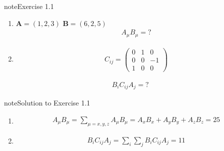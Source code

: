 \documentclass[letterpaper,10pt,english]{jupyterBook}
\begin{document}
\begin{sphinxadmonition}{note}{Exercise 1.1}


\begin{enumerate}
%
\item {} 
\sphinxAtStartPar
\(\mathbf{A} =(1,2,3)\)
\(\mathbf{B} =(6,2,5)\)
\begin{equation*}
\begin{split}A_\mu B_{\mu} =?\end{split}
\end{equation*}
\item {} \begin{equation*}
\begin{split} C_{ij} = \begin{pmatrix}
0&1&0\\
0&0&-1\\
1&0&0
\end{pmatrix}\end{split}
\end{equation*}
\end{enumerate}
\begin{equation*}
\begin{split}B_iC_{ij}A_j=?\end{split}
\end{equation*}\end{sphinxadmonition}
 \label{va/vec_alge:solu_ten}

\begin{sphinxadmonition}{note}{Solution to Exercise 1.1}


\begin{enumerate}
%
\item {} \begin{equation*}
\begin{split}A_\mu B_\mu =\sum_{\mu = x,y,z}A_\mu B_\mu = A_x B_x + A_y B_y+A_zB_z=25 \end{split}
\end{equation*}
\item {} \begin{equation*}
\begin{split}B_iC_{ij}A_j=\sum_{i}\sum_{j} B_iC_{ij}A_j = 11 \end{split}
\end{equation*}
\end{enumerate}
\end{sphinxadmonition}
\end{document}
